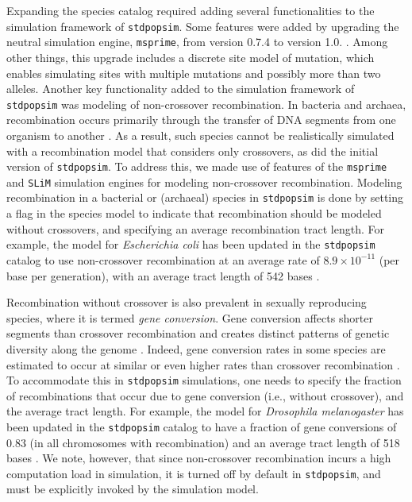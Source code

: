 \documentclass[hidelinks]{article}
\newcommand{\stdpopsim}{\texttt{stdpopsim}\xspace}
\begin{document}
Expanding the species catalog required adding several functionalities to the simulation framework of \stdpopsim.
Some features were added by upgrading the neutral simulation engine, \texttt{msprime}, from version 0.7.4 to version 1.0. \citep{Baumdicker2022}.
Among other things, this upgrade includes a discrete site model of mutation,
which enables simulating sites with multiple mutations and possibly more than two alleles.
Another key functionality added to the simulation framework of \stdpopsim was modeling of non-crossover recombination.
In bacteria and archaea, recombination occurs primarily through the transfer of DNA segments from one organism to another \citep{Thomas2005,Didelot2010,Gophna2022}.
As a result, such species cannot be realistically simulated with a recombination model that considers only crossovers,
as did the initial version of \stdpopsim.
To address this, we made use of features of the \texttt{msprime} and \texttt{SLiM} simulation engines for modeling non-crossover recombination.
Modeling recombination in a bacterial or (archaeal) species in \stdpopsim is done by setting a flag in the species model to indicate that recombination should be modeled without crossovers,
and specifying an average recombination tract length.
For example, the model for \textit{Escherichia coli} has been updated in the \stdpopsim catalog to use non-crossover recombination at an average rate of $8.9\times 10^{-11}$ (per base per generation),
with an average tract length of 542 bases \citep{Wielgoss2011,Didelot2012}.
%

Recombination without crossover is also prevalent in sexually reproducing species,
where it is termed \emph{gene conversion}.
%
Gene conversion affects shorter segments than crossover recombination and creates distinct patterns of genetic diversity along the genome \citep{Korunes2017}.
%
Indeed, gene conversion rates in some species are estimated to occur at similar or even higher rates than crossover recombination \citep{Gay2007,Comeron2012,Wijnker2013}.
%
To accommodate this in \stdpopsim simulations,
one needs to specify the fraction of recombinations that occur due to gene conversion (i.e., without crossover), and the average tract length.
For example, the model for \emph{Drosophila melanogaster} has been updated in the \stdpopsim catalog to have a fraction of gene conversions of 0.83 (in all chromosomes with recombination) and an average tract length of 518 bases \citep{Comeron2012}.
%
We note, however, that since non-crossover recombination incurs a high computation load in simulation,
it is turned off by default in \stdpopsim, and must be explicitly invoked by the simulation model.
\end{document}

